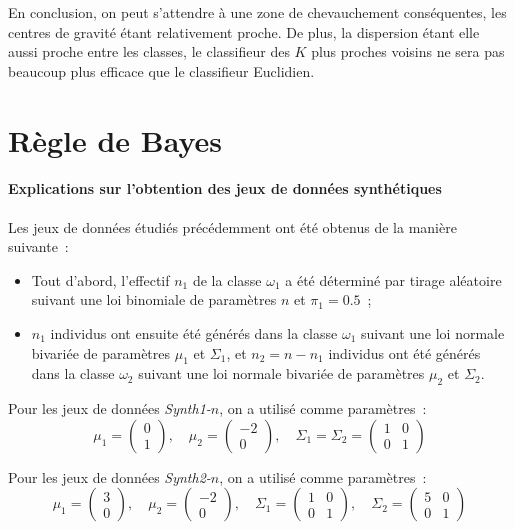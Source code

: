 \documentclass[a4paper,10pt]{report}
\begin{document}
En conclusion, on peut s'attendre à une zone de chevauchement conséquentes, les centres de gravité étant relativement proche. De plus, la dispersion étant elle aussi proche entre les classes, le classifieur des $K$ plus proches voisins ne sera pas beaucoup plus efficace que le classifieur Euclidien.












\chapter{Règle de Bayes}


\subsubsection{Explications sur l'obtention des jeux de données synthétiques}

Les jeux de données étudiés précédemment ont été obtenus de la manière suivante~:
\begin{itemize}
	\item Tout d’abord, l’effectif $n_1$ de la classe $\omega_1$ a été déterminé par tirage aléatoire suivant une loi binomiale de paramètres $n$ et $\pi_1 = 0.5$~;
	\item $n_1$ individus ont ensuite été générés dans la classe $\omega_1$ suivant une loi normale bivariée de paramètres $\mu_1$ et $\Sigma_{1}$, et $n_2 = n - n_1$ individus ont été générés dans la classe $\omega_2$ suivant une loi normale bivariée de paramètres $\mu_2$ et $\Sigma_{2}$.
\end{itemize}

Pour les jeux de données \textit{Synth1-$n$}, on a utilisé comme paramètres~:
\[
	\mu_1 = \begin{pmatrix} 0 \\ 1 \end{pmatrix}, 
	\quad \mu_2 = \begin{pmatrix} -2 \\ 0 \end{pmatrix},
	\quad \Sigma_1 = \Sigma_2 = \begin{pmatrix} 1 & 0 \\ 0 & 1 \end{pmatrix}
\]

Pour les jeux de données \textit{Synth2-$n$}, on a utilisé comme paramètres~:
\[
	\mu_1 = \begin{pmatrix} 3 \\ 0 \end{pmatrix}, 
	\quad \mu_2 = \begin{pmatrix} -2 \\ 0 \end{pmatrix},
	\quad \Sigma_1 = \begin{pmatrix} 1 & 0 \\ 0 & 1 \end{pmatrix}, 
	\quad \Sigma_2 = \begin{pmatrix} 5 & 0 \\ 0 & 1 \end{pmatrix}
\]
\end{document}
